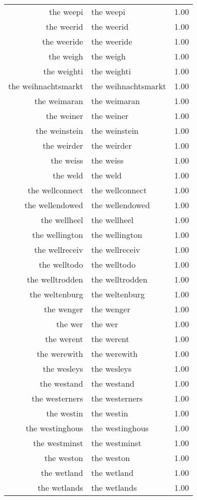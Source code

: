 \begin{table}[ht]
\begin{tabular}{rlr}
  the weepi & the weepi & 1.00 \\ 
  the weerid & the weerid & 1.00 \\ 
  the weeride & the weeride & 1.00 \\ 
  the weigh & the weigh & 1.00 \\ 
  the weighti & the weighti & 1.00 \\ 
  the weihnachtsmarkt & the weihnachtsmarkt & 1.00 \\ 
  the weimaran & the weimaran & 1.00 \\ 
  the weiner & the weiner & 1.00 \\ 
  the weinstein & the weinstein & 1.00 \\ 
  the weirder & the weirder & 1.00 \\ 
  the weiss & the weiss & 1.00 \\ 
  the weld & the weld & 1.00 \\ 
  the wellconnect & the wellconnect & 1.00 \\ 
  the wellendowed & the wellendowed & 1.00 \\ 
  the wellheel & the wellheel & 1.00 \\ 
  the wellington & the wellington & 1.00 \\ 
  the wellreceiv & the wellreceiv & 1.00 \\ 
  the welltodo & the welltodo & 1.00 \\ 
  the welltrodden & the welltrodden & 1.00 \\ 
  the weltenburg & the weltenburg & 1.00 \\ 
  the wenger & the wenger & 1.00 \\ 
  the wer & the wer & 1.00 \\ 
  the werent & the werent & 1.00 \\ 
  the werewith & the werewith & 1.00 \\ 
  the wesleys & the wesleys & 1.00 \\ 
  the westand & the westand & 1.00 \\ 
  the westerners & the westerners & 1.00 \\ 
  the westin & the westin & 1.00 \\ 
  the westinghous & the westinghous & 1.00 \\ 
  the westminst & the westminst & 1.00 \\ 
  the weston & the weston & 1.00 \\ 
  the wetland & the wetland & 1.00 \\ 
  the wetlands & the wetlands & 1.00 \\ 

\end{tabular}
\end{table}

